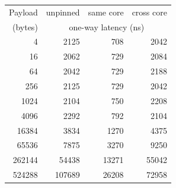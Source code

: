 \begin{tabular}{rrrr}
\toprule
Payload & unpinned & same core & cross core \\
(bytes) & \multicolumn{3}{c}{one-way latency (ns)} \\
\midrule
4 & 2125 & 708 & 2042 \\
16 & 2062 & 729 & 2084 \\
64 & 2042 & 729 & 2188 \\
256 & 2125 & 729 & 2042 \\
1024 & 2104 & 750 & 2208 \\
4096 & 2292 & 792 & 2104 \\
16384 & 3834 & 1270 & 4375 \\
65536 & 7875 & 3270 & 9250 \\
262144 & 54438 & 13271 & 55042 \\
524288 & 107689 & 26208 & 72958 \\
\bottomrule
\end{tabular}
